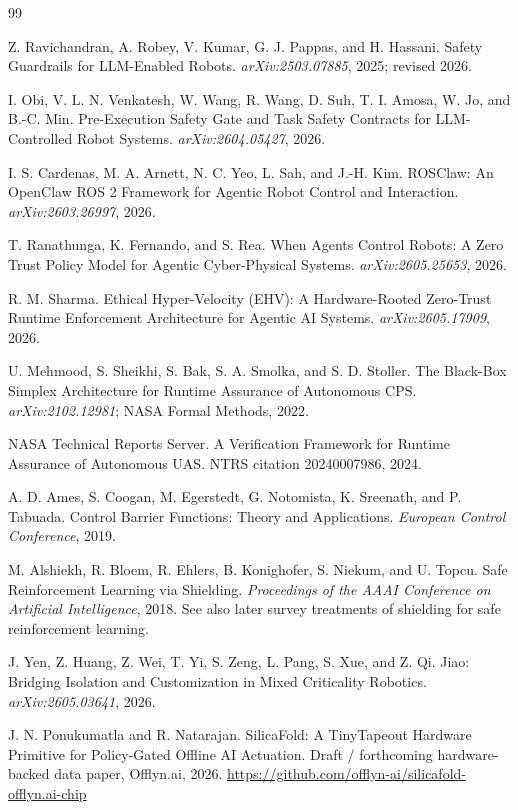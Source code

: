 \documentclass[10pt]{article}
\begin{document}
\begin{thebibliography}{99}

Z. Ravichandran, A. Robey, V. Kumar, G. J. Pappas, and H. Hassani.
\newblock Safety Guardrails for LLM-Enabled Robots.
\newblock \emph{arXiv:2503.07885}, 2025; revised 2026.

I. Obi, V. L. N. Venkatesh, W. Wang, R. Wang, D. Suh, T. I. Amosa, W. Jo, and B.-C. Min.
\newblock Pre-Execution Safety Gate and Task Safety Contracts for LLM-Controlled Robot Systems.
\newblock \emph{arXiv:2604.05427}, 2026.

I. S. Cardenas, M. A. Arnett, N. C. Yeo, L. Sah, and J.-H. Kim.
\newblock ROSClaw: An OpenClaw ROS 2 Framework for Agentic Robot Control and Interaction.
\newblock \emph{arXiv:2603.26997}, 2026.

T. Ranathunga, K. Fernando, and S. Rea.
\newblock When Agents Control Robots: A Zero Trust Policy Model for Agentic Cyber-Physical Systems.
\newblock \emph{arXiv:2605.25653}, 2026.

R. M. Sharma.
\newblock Ethical Hyper-Velocity (EHV): A Hardware-Rooted Zero-Trust Runtime Enforcement Architecture for Agentic AI Systems.
\newblock \emph{arXiv:2605.17909}, 2026.

U. Mehmood, S. Sheikhi, S. Bak, S. A. Smolka, and S. D. Stoller.
\newblock The Black-Box Simplex Architecture for Runtime Assurance of Autonomous CPS.
\newblock \emph{arXiv:2102.12981}; NASA Formal Methods, 2022.

NASA Technical Reports Server.
\newblock A Verification Framework for Runtime Assurance of Autonomous UAS.
\newblock NTRS citation 20240007986, 2024.

A. D. Ames, S. Coogan, M. Egerstedt, G. Notomista, K. Sreenath, and P. Tabuada.
\newblock Control Barrier Functions: Theory and Applications.
\newblock \emph{European Control Conference}, 2019.

M. Alshiekh, R. Bloem, R. Ehlers, B. Konighofer, S. Niekum, and U. Topcu.
\newblock Safe Reinforcement Learning via Shielding.
\newblock \emph{Proceedings of the AAAI Conference on Artificial Intelligence}, 2018. See also later survey treatments of shielding for safe reinforcement learning.

J. Yen, Z. Huang, Z. Wei, T. Yi, S. Zeng, L. Pang, S. Xue, and Z. Qi.
\newblock Jiao: Bridging Isolation and Customization in Mixed Criticality Robotics.
\newblock \emph{arXiv:2605.03641}, 2026.

J. N. Ponukumatla and R. Natarajan.
\newblock SilicaFold: A TinyTapeout Hardware Primitive for Policy-Gated Offline AI Actuation.
\newblock Draft / forthcoming hardware-backed data paper, Offlyn.ai, 2026.
\newblock \url{https://github.com/offlyn-ai/silicafold-offlyn.ai-chip}

\end{thebibliography}
\end{document}

